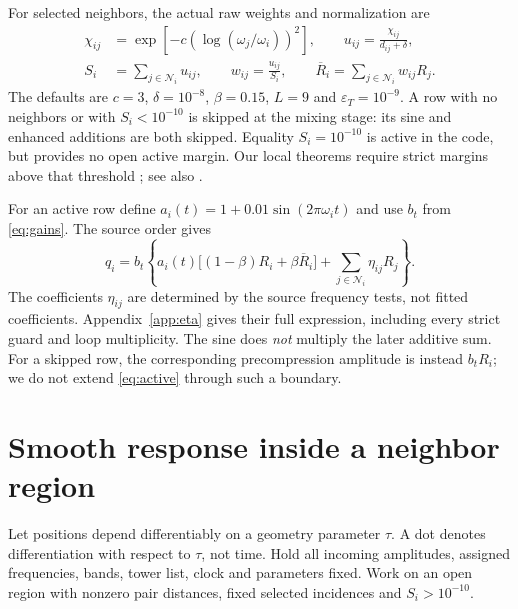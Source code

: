 \documentclass[11pt,a4paper]{article}
\theoremstyle{remark}\newtheorem{remark}[theorem]{Remark}
\newcommand{\Rbar}{\overline R}
\numberwithin{equation}{section}
\begin{document}
For selected neighbors, the actual raw weights and normalization are
\begin{align}
\chi_{ij}&=\exp[-c(\log(\omega_j/\omega_i))^2],\qquad
u_{ij}=\frac{\chi_{ij}}{d_{ij}+\delta},\label{eq:raw-weights}\\
S_i&=\sum_{j\in\mathcal N_i}u_{ij},\qquad
w_{ij}=\frac{u_{ij}}{S_i},\qquad
\Rbar_i=\sum_{j\in\mathcal N_i}w_{ij}R_j.\label{eq:normalized}
\end{align}
The defaults are $c=3$, $\delta=10^{-8}$, $\beta=0.15$,
$L=9$ and $\varepsilon_T=10^{-9}$.
A row with no neighbors or with $S_i<10^{-10}$ is skipped at the mixing
stage: its sine and enhanced additions are both skipped.
Equality $S_i=10^{-10}$ is active in the code, but provides no open active
margin. Our local theorems require strict margins above that threshold
\cite[lines 151--163]{T}; see also \cite[A03]{A}.

For an active row define $a_i(t)=1+0.01\sin(2\pi\omega_i t)$ and use $b_t$
from \eqref{eq:gains}. The source order gives
\begin{equation}
q_i=b_t\left\{
a_i(t)\big[(1-\beta)R_i+\beta\Rbar_i\big]
+\sum_{j\in\mathcal N_i}\eta_{ij}R_j
\right\}.\label{eq:active}
\end{equation}
The coefficients $\eta_{ij}$ are determined by the source frequency tests,
not fitted coefficients. Appendix~\ref{app:eta} gives their full expression,
including every strict guard and loop multiplicity.
The sine does \emph{not} multiply the later additive sum.
For a skipped row, the corresponding precompression amplitude is instead
$b_tR_i$; we do not extend \eqref{eq:active} through such a boundary.

\section{Smooth response inside a neighbor region}\label{sec:smooth}

Let positions depend differentiably on a geometry parameter $\tau$.
A dot denotes differentiation with respect to $\tau$, not time.
Hold all incoming amplitudes, assigned frequencies, bands, tower list,
clock and parameters fixed. Work on an open region with nonzero pair
distances, fixed selected incidences and $S_i>10^{-10}$.
\end{document}
